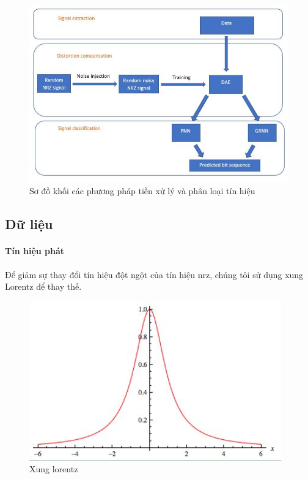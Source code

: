 \begin{figure} [ht]
	\centering
	\captionsetup{justification=centering}
	\includegraphics [scale=1] {Image/flow_chart}
	\caption{Sơ đồ khối các phương pháp tiền xử lý và phân loại tín hiệu}
\end{figure}

\subsection{Dữ liệu}
 \paragraph{Tín hiệu phát}
 Để giảm sự thay đổi tín hiệu đột ngột của tín hiệu \ac{nrz}, chúng tôi sử dụng xung Lorentz để thay thế. 
\begin{figure} [ht]
	\centering
	\captionsetup{justification=centering}
	\includegraphics [scale=0.7] {Image/lorentz_pulse}
	\caption{Xung lorentz}
\end{figure}

